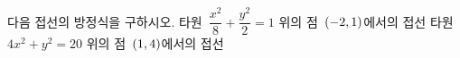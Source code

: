 다음 접선의 방정식을 구하시오.
 타원~$\dfrac{x^2}{8}+\dfrac{y^2}{2}=1$ 위의 점~$(-2{,}\mkern3mu\mathopen{}1)$에서의 접선
 타원~$4x^2+y^2=20$ 위의 점~$(1{,}\mkern3mu\mathopen{}4)$에서의 접선
